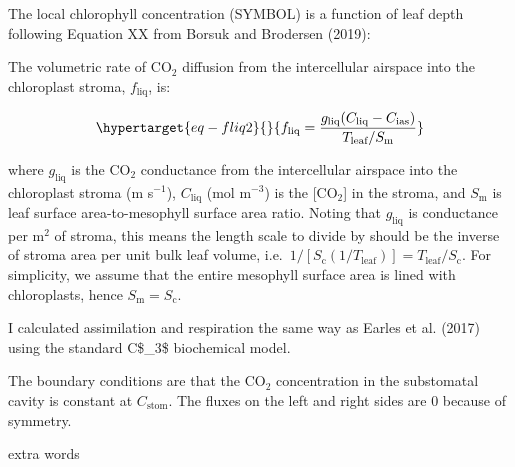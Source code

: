 \documentclass[
  letterpaper,
  DIV=11,
  numbers=noendperiod]{scrartcl}
\begin{document}
The local chlorophyll concentration (SYMBOL) is a function of leaf depth
following Equation XX from Borsuk and Brodersen (2019):

The volumetric rate of CO\(_2\) diffusion from the intercellular
airspace into the chloroplast stroma, \(f_\text{liq}\), is:

\begin{equation}\protect\hypertarget{eq-fliq2}{}{f_\text{liq} = \frac{g_\text{liq} (C_\text{liq} - C_\text{ias})}{T_\text{leaf} / S_\text{m}}}\label{eq-fliq2}\end{equation}

where \(g_\text{liq}\) is the CO\(_2\) conductance from the
intercellular airspace into the chloroplast stroma (m s\(^{-1}\)),
\(C_\text{liq}\) (mol m\(^{-3}\)) is the {[}CO\(_2\){]} in the stroma,
and \(S_\text{m}\) is leaf surface area-to-mesophyll surface area ratio.
Noting that \(g_\text{liq}\) is conductance per m\(^2\) of stroma, this
means the length scale to divide by should be the inverse of stroma area
per unit bulk leaf volume,
i.e.~\(1/[S_\text{c} (1 / T_\text{leaf})] = T_\text{leaf} / S_\text{c}\).
For simplicity, we assume that the entire mesophyll surface area is
lined with chloroplasts, hence \(S_\text{m} = S_\text{c}\).

I calculated assimilation and respiration the same way as Earles et al.
(2017) using the standard C\$\_3\$ biochemical model.

The boundary conditions are that the CO\(_2\) concentration in the
substomatal cavity is constant at \(C_\text{stom}\). The fluxes on the
left and right sides are 0 because of symmetry.

extra words
\end{document}
